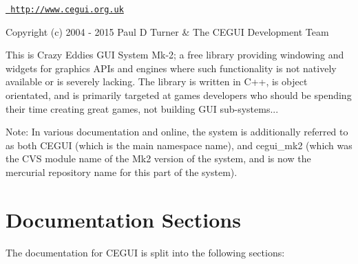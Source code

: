 \href{http://www.cegui.org.uk}{\texttt{ http\+://www.\+cegui.\+org.\+uk}}

Copyright (c) 2004 -\/ 2015 Paul D Turner \& The C\+E\+G\+UI Development Team

This is Crazy Eddie\textquotesingle{}s G\+UI System Mk-\/2; a free library providing windowing and widgets for graphics A\+P\+Is and engines where such functionality is not natively available or is severely lacking. The library is written in C++, is object orientated, and is primarily targeted at games developers who should be spending their time creating great games, not building G\+UI sub-\/systems...

Note\+: In various documentation and online, the system is additionally referred to as both C\+E\+G\+UI (which is the main namespace name), and cegui\+\_\+mk2 (which was the C\+VS module name of the Mk2 version of the system, and is now the mercurial repository name for this part of the system).\hypertarget{index_main_sec_1}{}\section{Documentation Sections}\label{index_main_sec_1}
The documentation for C\+E\+G\+UI is split into the following sections\+:
